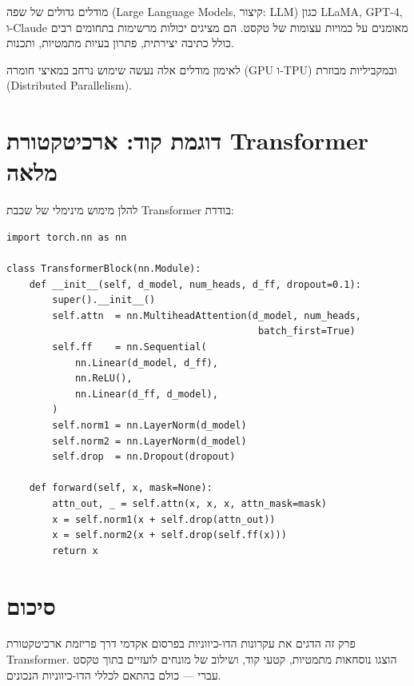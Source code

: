 מודלים גדולים של שפה (\textenglish{Large Language Models}, קיצור: \textenglish{LLM})
כגון \textenglish{LLaMA}, \textenglish{GPT-4}, ו-\textenglish{Claude}
מאומנים על כמויות עצומות של טקסט. הם מציגים יכולות מרשימות בתחומים רבים כולל
כתיבה יצירתית, פתרון בעיות מתמטיות, ותכנות.

לאימון מודלים אלה נעשה שימוש נרחב במאיצי חומרה (\textenglish{GPU} ו-\textenglish{TPU})
ובמקביליות מבוזרת (\textenglish{Distributed Parallelism}).

\section{דוגמת קוד: ארכיטקטורת \textenglish{Transformer} מלאה}

להלן מימוש מינימלי של שכבת \textenglish{Transformer} בודדת:

\begin{LTR}
\begin{verbatim}
import torch.nn as nn

class TransformerBlock(nn.Module):
    def __init__(self, d_model, num_heads, d_ff, dropout=0.1):
        super().__init__()
        self.attn  = nn.MultiheadAttention(d_model, num_heads,
                                            batch_first=True)
        self.ff    = nn.Sequential(
            nn.Linear(d_model, d_ff),
            nn.ReLU(),
            nn.Linear(d_ff, d_model),
        )
        self.norm1 = nn.LayerNorm(d_model)
        self.norm2 = nn.LayerNorm(d_model)
        self.drop  = nn.Dropout(dropout)

    def forward(self, x, mask=None):
        attn_out, _ = self.attn(x, x, x, attn_mask=mask)
        x = self.norm1(x + self.drop(attn_out))
        x = self.norm2(x + self.drop(self.ff(x)))
        return x
\end{verbatim}
\end{LTR}

\section{סיכום}

פרק זה הדגים את עקרונות הדו-כיווניות בפרסום אקדמי דרך פריזמת ארכיטקטורת
\textenglish{Transformer}. הוצגו נוסחאות מתמטיות, קטעי קוד, ושילוב של מונחים
לועזיים בתוך טקסט עברי — כולם בהתאם לכללי הדו-כיווניות הנכונים.
